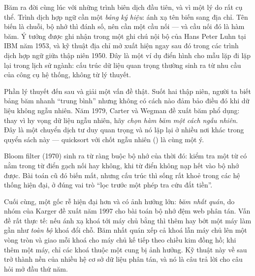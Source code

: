\documentclass[../../algorithm.tex]{subfiles}
\begin{document}
Băm ra đời cùng lúc với những trình biên dịch đầu tiên, và vì một lý do rất cụ thể. Trình dịch hợp ngữ cần một \emph{bảng ký hiệu}: ánh xạ tên biến sang địa chỉ. Tên biến là chuỗi, bộ nhớ thì đánh số, nên cần một cầu nối --- và cầu nối đó là hàm băm. Ý tưởng được ghi nhận trong một ghi chú nội bộ của Hans Peter Luhn tại IBM năm 1953, và kỹ thuật địa chỉ mở xuất hiện ngay sau đó trong các trình dịch hợp ngữ giữa thập niên 1950. Đây là một ví dụ điển hình cho mẫu lặp đi lặp lại trong lịch sử ngành: cấu trúc dữ liệu quan trọng thường sinh ra từ nhu cầu của công cụ hệ thống, không từ lý thuyết.

Phần lý thuyết đến sau và giải một vấn đề thật. Suốt hai thập niên, người ta biết bảng băm nhanh ``trung bình'' nhưng không có cách nào đảm bảo điều đó khi dữ liệu không ngẫu nhiên. Năm 1979, Carter và Wegman đề xuất băm phổ dụng: thay vì hy vọng dữ liệu ngẫu nhiên, hãy \emph{chọn hàm băm một cách ngẫu nhiên}. Đây là một chuyển dịch tư duy quan trọng và nó lặp lại ở nhiều nơi khác trong quyển sách này --- quicksort với chốt ngẫu nhiên () là cùng một ý.

Bloom filter (1970) sinh ra từ ràng buộc bộ nhớ của thời đó: kiểm tra một từ có nằm trong từ điển gạch nối hay không, khi từ điển không nạp hết vào bộ nhớ được. Bài toán cũ đó biến mất, nhưng cấu trúc thì sống rất khoẻ trong các hệ thống hiện đại, ở đúng vai trò ``lọc trước một phép tra cứu đắt tiền''.

Cuối cùng, một gốc rễ hiện đại hơn và có ảnh hưởng lớn: \emph{băm nhất quán}, do nhóm của Karger đề xuất năm 1997 cho bài toán bộ nhớ đệm web phân tán. Vấn đề rất thực tế: nếu ánh xạ khoá tới máy chủ bằng  thì thêm hay bớt một máy làm gần như \emph{toàn bộ} khoá đổi chỗ. Băm nhất quán xếp cả khoá lẫn máy chủ lên một vòng tròn và giao mỗi khoá cho máy chủ kế tiếp theo chiều kim đồng hồ; khi thêm một máy, chỉ các khoá thuộc một cung bị ảnh hưởng. Kỹ thuật này về sau trở thành nền của nhiều hệ cơ sở dữ liệu phân tán, và nó là câu trả lời cho câu hỏi mở đầu thứ năm.
\end{document}
